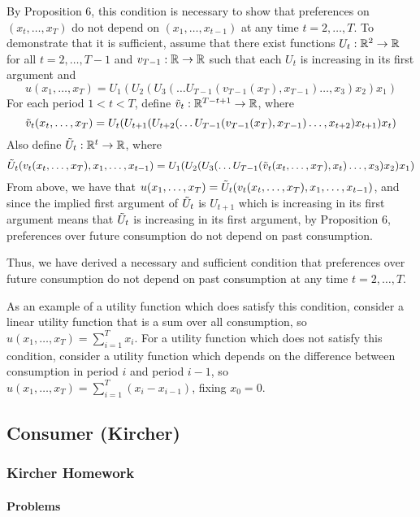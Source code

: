\documentclass[12pt]{article}
\begin{document}
By Proposition 6, this condition is necessary to show that preferences on $(x_t,\dots,x_T)$ do not depend on $(x_1,\dots,x_{t-1})$ at any time $t = 2,\dots,T$. To demonstrate that it is sufficient, assume that there exist functions $U_t : \mathbb{R}^2 \to \mathbb{R}$ for all $t = 2,\dots,T-1$ and $v_{T-1} : \mathbb{R} \to \mathbb{R}$ such that each $U_t$ is increasing in its first argument and
\[
u(x_1,\dots,x_T) = U_1(U_2(U_3(\dots U_{T-1}(v_{T-1}(x_T),x_{T-1}) \dots,x_3)x_2)x_1)
\]
For each period $1 < t < T$, define $\Tilde{v}_t : \mathbb{R}^{T-t+1} \to \mathbb{R}$, where
\[
\Tilde{v}_t(x_t,\dots,x_T) = U_{t}(U_{t+1}(U_{t+2}(\dots U_{T-1}(v_{T-1}(x_T),x_{T-1}) \dots,x_{t+2})x_{t+1})x_t)
\]
Also define $\Tilde{U}_t : \mathbb{R}^t \to \mathbb{R}$, where
\[
\Tilde{U}_t(v_t(x_t,\dots,x_T), x_1,\dots,x_{t-1}) = U_1(U_2(U_3(\dots U_{T-1}(\Tilde{v}_{t}(x_t,\dots,x_T),x_{t}) \dots,x_3)x_2)x_1)
\]
From above, we have that $u(x_1,\dots,x_T) = \Tilde{U}_t(v_t(x_t,\dots,x_T), x_1,\dots,x_{t-1})$, and since the implied first argument of $\Tilde{U}_t$ is $U_{t+1}$ which is increasing in its first argument means that $\Tilde{U}_t$ is increasing in its first argument, by Proposition 6, preferences over future consumption do not depend on past consumption.

Thus, we have derived a necessary and sufficient condition that preferences over future consumption do not depend on past consumption at any time $t = 2,\dots,T$.

\medskip

As an example of a utility function which does satisfy this condition, consider a linear utility function that is a sum over all consumption, so $u(x_1,\dots,x_T) = \sum_{i=1}^T x_i$. For a utility function which does not satisfy this condition, consider a utility function which depends on the difference between consumption in period $i$ and period $i-1$, so $u(x_1,\dots,x_T) = \sum_{i=1}^T (x_i - x_{i-1})$, fixing $x_0 = 0$. 

\newpage
\subsection{Consumer (Kircher)}

\subsubsection{Kircher Homework}

\paragraph{Problems}
\end{document}
